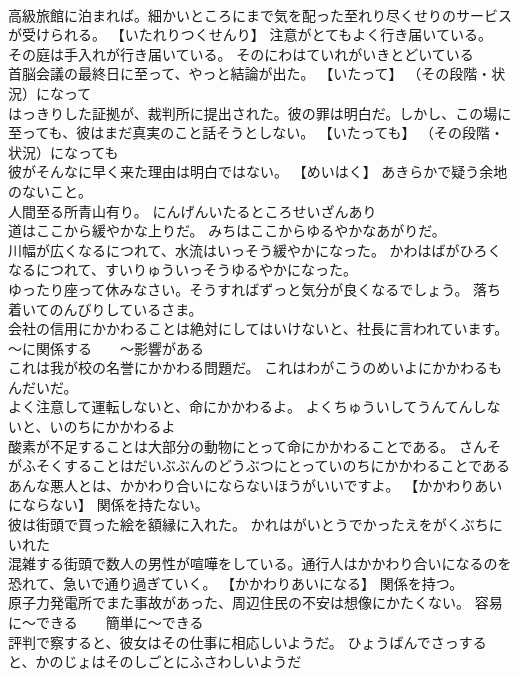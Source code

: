 \documentclass[8pt]{extreport}
\begin{document}
\begin{CJK}{UTF8}{min}
\\	高級旅館に泊まれば。細かいところにまで気を配った至れり尽くせりのサービスが受けられる。	【いたれりつくせんり】 注意がとてもよく行き届いている。
\\	その庭は手入れが行き届いている。	そのにわはていれがいきとどいている 
\\	首脳会議の最終日に至って、やっと結論が出た。	【いたって】 （その段階・状況）になって
\\	はっきりした証拠が、裁判所に提出された。彼の罪は明白だ。しかし、この場に至っても、彼はまだ真実のこと話そうとしない。	【いたっても】 （その段階・状況）になっても
\\	彼がそんなに早く来た理由は明白ではない。	【めいはく】 あきらかで疑う余地のないこと。
\\	人間至る所青山有り。	にんげんいたるところせいざんあり 
\\	道はここから緩やかな上りだ。	みちはここからゆるやかなあがりだ。 
\\	川幅が広くなるにつれて、水流はいっそう緩やかになった。	かわはばがひろくなるにつれて、すいりゅういっそうゆるやかになった。 
\\	ゆったり座って休みなさい。そうすればずっと気分が良くなるでしょう。	落ち着いてのんびりしているさま。
\\	会社の信用にかかわることは絶対にしてはいけないと、社長に言われています。	～に関係する　　～影響がある
\\	これは我が校の名誉にかかわる問題だ。	これはわがこうのめいよにかかわるもんだいだ。 
\\	よく注意して運転しないと、命にかかわるよ。	よくちゅういしてうんてんしないと、いのちにかかわるよ 
\\	酸素が不足することは大部分の動物にとって命にかかわることである。	さんそがふそくすることはだいぶぶんのどうぶつにとっていのちにかかわることである 
\\	あんな悪人とは、かかわり合いにならないほうがいいですよ。	【かかわりあいにならない】 関係を持たない。
\\	彼は街頭で買った絵を額縁に入れた。	かれはがいとうでかったえをがくぶちにいれた 
\\	混雑する街頭で数人の男性が喧嘩をしている。通行人はかかわり合いになるのを恐れて、急いで通り過ぎていく。	【かかわりあいになる】 関係を持つ。
\\	原子力発電所でまた事故があった、周辺住民の不安は想像にかたくない。	容易に～できる　　簡単に～できる
\\	評判で察すると、彼女はその仕事に相応しいようだ。	ひょうばんでさっすると、かのじょはそのしごとにふさわしいようだ 

\end{CJK}
\end{document}
